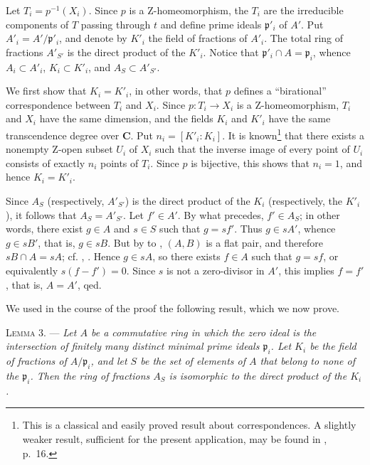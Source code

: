 Let $T_i=p^{-1}(X_i)$. Since $p$ is a Z-homeomorphism, the $T_i$ are the irreducible components of $T$ passing through $t$ and define prime ideals $\mathfrak{p}'_i$ of $A'$. Put $A'_i=A'/\mathfrak{p}'_i$, and denote by $K'_i$ the field of fractions of $A'_i$. The total ring of fractions $A'_{S'}$ is the direct product of the $K'_i$. Notice that $\mathfrak{p}'_i\cap A=\mathfrak{p}_i$, whence $A_i\subset A'_i$, $K_i\subset K'_i$, and $A_S\subset A'_{S'}$.

We first show that $K_i=K'_i$, in other words, that $p$ defines a ``birational'' correspondence between $T_i$ and $X_i$. Since $p:T_i\to X_i$ is a Z-homeomorphism, $T_i$ and $X_i$ have the same dimension, and the fields $K_i$ and $K'_i$ have the same transcendence degree over $\mathbf{C}$. Put $n_i=[K'_i:K_i]$. It is known\footnote{This is a classical and easily proved result about correspondences. A slightly weaker result, sufficient for the present application, may be found in , p.~16.} that there exists a nonempty Z-open subset $U_i$ of $X_i$ such that the inverse image of every point of $U_i$ consists of exactly $n_i$ points of $T_i$. Since $p$ is bijective, this shows that $n_i=1$, and hence $K_i=K'_i$.

Since $A_S$ (respectively, $A'_{S'}$) is the direct product of the $K_i$ (respectively, the $K'_i$), it follows that $A_S=A'_{S'}$. Let $f'\in A'$. By what precedes, $f'\in A_S$; in other words, there exist $g\in A$ and $s\in S$ such that $g=sf'$. Thus $g\in sA'$, whence $g\in sB'$, that is, $g\in sB$. But by  to , $(A,B)$ is a flat pair, and therefore $sB\cap A=sA$; cf. , . Hence $g\in sA$, so there exists $f\in A$ such that $g=sf$, or equivalently $s(f-f')=0$. Since $s$ is not a zero-divisor in $A'$, this implies $f=f'$, that is, $A=A'$, qed.

We used in the course of the proof the following result, which we now prove.

\textsc{Lemma 3}. --- \emph{Let $A$ be a commutative ring in which the zero ideal is the intersection of finitely many distinct minimal prime ideals $\mathfrak{p}_i$. Let $K_i$ be the field of fractions of $A/\mathfrak{p}_i$, and let $S$ be the set of elements of $A$ that belong to none of the $\mathfrak{p}_i$. Then the ring of fractions $A_S$ is isomorphic to the direct product of the $K_i$.}

